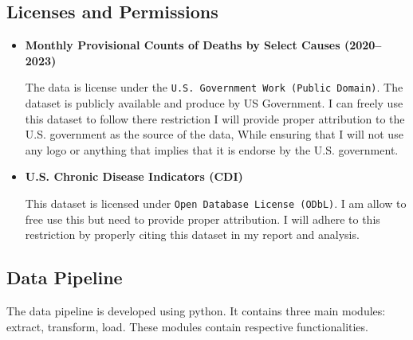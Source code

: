 \documentclass[a4paper,10pt]{article}
\begin{document}
	\subsection{Licenses and Permissions}
	\begin{itemize}
	\item \textbf{Monthly Provisional Counts of Deaths by Select Causes (2020--2023)}
	
	The data is license under the \texttt{U.S. Government Work (Public Domain)}. The dataset is publicly available and produce by US Government. I can freely use this dataset to follow there restriction I will provide proper attribution to the U.S. government as the source of the data, While ensuring that I will not use any logo or anything that implies that it is endorse by the U.S. government. \cite{licenses2}
	\end{itemize}
	
	\begin{itemize}
	\item \textbf{U.S. Chronic Disease Indicators (CDI)} 
		
	This dataset is licensed under \texttt{Open Database License (ODbL)}. I am allow to free use this but need to provide proper attribution. I will adhere to this restriction by properly citing this dataset in my report and analysis. \cite{licenses1}
		
	\end{itemize}


	\subsection{Data Pipeline}
The data pipeline is developed using python. It contains three main modules: extract, transform, load. These modules contain respective functionalities.
 
\end{document}
